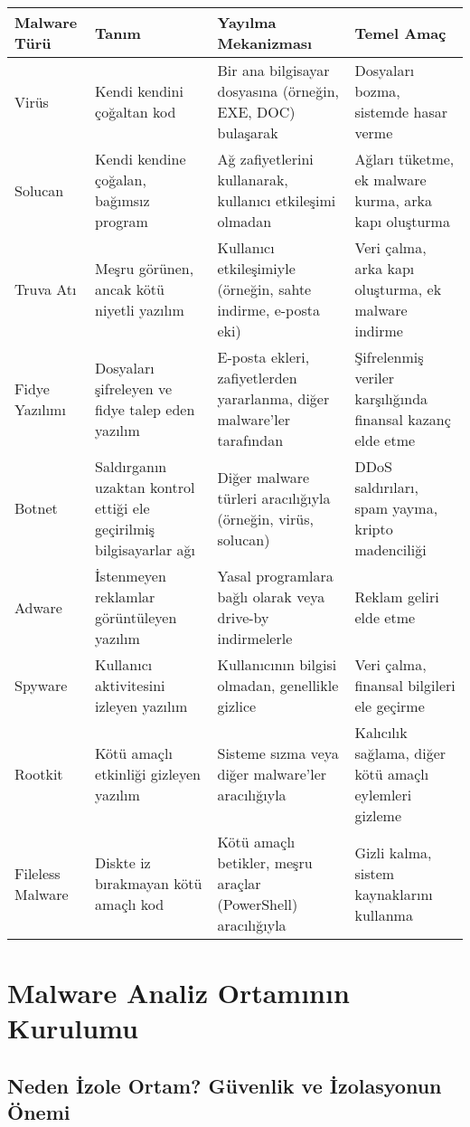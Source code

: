 \begin{longtable}{|l|p{4cm}|p{4cm}|p{4cm}|}
\hline
\textbf{Malware Türü} & \textbf{Tanım} & \textbf{Yayılma Mekanizması} & \textbf{Temel Amaç} \\
\hline
Virüs & Kendi kendini çoğaltan kod & Bir ana bilgisayar dosyasına (örneğin, EXE, DOC) bulaşarak & Dosyaları bozma, sistemde hasar verme \\
\hline
Solucan & Kendi kendine çoğalan, bağımsız program & Ağ zafiyetlerini kullanarak, kullanıcı etkileşimi olmadan & Ağları tüketme, ek malware kurma, arka kapı oluşturma \\
\hline
Truva Atı & Meşru görünen, ancak kötü niyetli yazılım & Kullanıcı etkileşimiyle (örneğin, sahte indirme, e-posta eki) & Veri çalma, arka kapı oluşturma, ek malware indirme \\
\hline
Fidye Yazılımı & Dosyaları şifreleyen ve fidye talep eden yazılım & E-posta ekleri, zafiyetlerden yararlanma, diğer malware'ler tarafından & Şifrelenmiş veriler karşılığında finansal kazanç elde etme \\
\hline
Botnet & Saldırganın uzaktan kontrol ettiği ele geçirilmiş bilgisayarlar ağı & Diğer malware türleri aracılığıyla (örneğin, virüs, solucan) & DDoS saldırıları, spam yayma, kripto madenciliği \\
\hline
Adware & İstenmeyen reklamlar görüntüleyen yazılım & Yasal programlara bağlı olarak veya drive-by indirmelerle & Reklam geliri elde etme \\
\hline
Spyware & Kullanıcı aktivitesini izleyen yazılım & Kullanıcının bilgisi olmadan, genellikle gizlice & Veri çalma, finansal bilgileri ele geçirme \\
\hline
Rootkit & Kötü amaçlı etkinliği gizleyen yazılım & Sisteme sızma veya diğer malware'ler aracılığıyla & Kalıcılık sağlama, diğer kötü amaçlı eylemleri gizleme \\
\hline
Fileless Malware & Diskte iz bırakmayan kötü amaçlı kod & Kötü amaçlı betikler, meşru araçlar (PowerShell) aracılığıyla & Gizli kalma, sistem kaynaklarını kullanma \\
\hline
\end{longtable}

\section{Malware Analiz Ortamının Kurulumu}

\subsection{Neden İzole Ortam? Güvenlik ve İzolasyonun Önemi}

